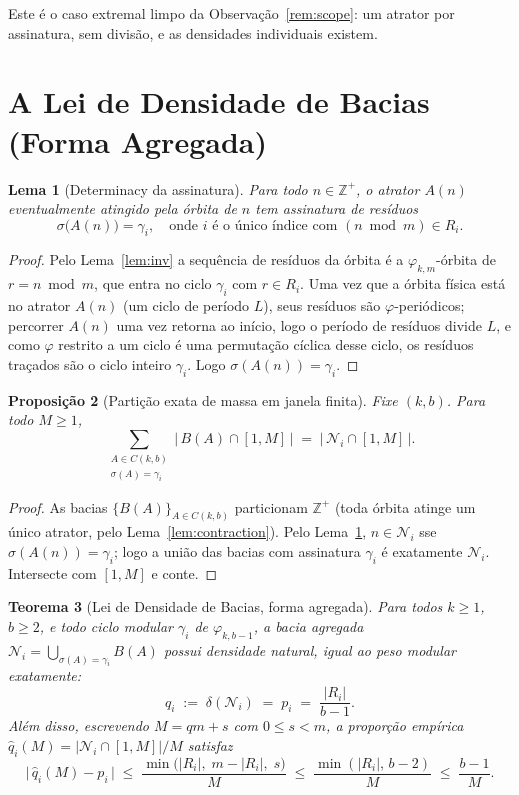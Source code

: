 \documentclass[11pt]{article}
\newtheorem{theorem}{Teorema}[section]
\newtheorem{lemma}[theorem]{Lema}
\newtheorem{proposition}[theorem]{Proposição}
\theoremstyle{definition}
\theoremstyle{remark}
\begin{document}
Este é o caso extremal limpo da Observação~\ref{rem:scope}: um atrator por assinatura, sem divisão, e as densidades individuais existem.

\section{A Lei de Densidade de Bacias (Forma Agregada)}\label{sec:bdl}

\begin{lemma}[Determinacy da assinatura]\label{lem:sig}
Para todo $n \in \mathbb{Z}^+$, o atrator $A(n)$ eventualmente atingido pela órbita de $n$ tem assinatura de resíduos
\[
\sigma\big(A(n)\big) = \gamma_i, \quad \text{onde } i \text{ é o único índice com } (n \bmod m) \in R_i.
\]
\end{lemma}

\begin{proof}
Pelo Lema~\ref{lem:inv} a sequência de resíduos da órbita é a $\varphi_{k,m}$-órbita de $r = n \bmod m$, que entra no ciclo $\gamma_i$ com $r \in R_i$. Uma vez que a órbita física está no atrator $A(n)$ (um ciclo de período $L$), seus resíduos são $\varphi$-periódicos; percorrer $A(n)$ uma vez retorna ao início, logo o período de resíduos divide $L$, e como $\varphi$ restrito a um ciclo é uma permutação cíclica desse ciclo, os resíduos traçados são o ciclo inteiro $\gamma_i$. Logo $\sigma(A(n)) = \gamma_i$.
\end{proof}

\begin{proposition}[Partição exata de massa em janela finita]\label{prop:partition}
Fixe $(k,b)$. Para todo $M \ge 1$,
\[
\sum_{\substack{A \in C(k,b) \\ \sigma(A) = \gamma_i}} \big|\, B(A) \cap [1,M] \,\big| \;=\; \big|\, \mathcal{N}_i \cap [1,M] \,\big|.
\]
\end{proposition}

\begin{proof}
As bacias $\{B(A)\}_{A \in C(k,b)}$ particionam $\mathbb{Z}^+$ (toda órbita atinge um único atrator, pelo Lema~\ref{lem:contraction}). Pelo Lema~\ref{lem:sig}, $n \in \mathcal{N}_i$ sse $\sigma(A(n)) = \gamma_i$; logo a união das bacias com assinatura $\gamma_i$ é exatamente $\mathcal{N}_i$. Intersecte com $[1,M]$ e conte.
\end{proof}

\begin{theorem}[Lei de Densidade de Bacias, forma agregada]\label{thm:bdl}
Para todos $k \ge 1$, $b \ge 2$, e todo ciclo modular $\gamma_i$ de $\varphi_{k,b-1}$, a bacia agregada $\mathcal{N}_i = \bigcup_{\sigma(A) = \gamma_i} B(A)$ possui densidade natural, igual ao peso modular exatamente:
\[
q_i \;:=\; \delta(\mathcal{N}_i) \;=\; p_i \;=\; \frac{|R_i|}{b-1}.
\]
Além disso, escrevendo $M = qm + s$ com $0 \le s < m$, a proporção empírica $\hat q_i(M) = |\mathcal{N}_i \cap [1,M]|/M$ satisfaz
\[
\big|\, \hat q_i(M) - p_i \,\big| \;\le\; \frac{\min\big(|R_i|,\; m-|R_i|,\; s\big)}{M} \;\le\; \frac{\min(|R_i|,\, b-2)}{M} \;\le\; \frac{b-1}{M}.
\]
\end{theorem}
\end{document}
